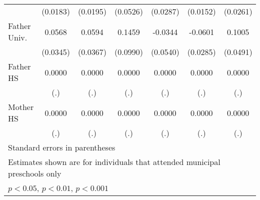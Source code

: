 \begin{table}[htbp]
\begin{tabular}{l*{6}{c}}
            &    (0.0183)         &    (0.0195)         &    (0.0526)         &    (0.0287)         &    (0.0152)         &    (0.0261)         \\
\addlinespace
Father Univ.&      0.0568         &      0.0594         &      0.1459         &     -0.0344         &     -0.0601\sym{*}  &      0.1005\sym{*}  \\
            &    (0.0345)         &    (0.0367)         &    (0.0990)         &    (0.0540)         &    (0.0285)         &    (0.0491)         \\
\addlinespace
Father HS   &      0.0000         &      0.0000         &      0.0000         &      0.0000         &      0.0000         &      0.0000         \\
            &         (.)         &         (.)         &         (.)         &         (.)         &         (.)         &         (.)         \\
\addlinespace
Mother HS   &      0.0000         &      0.0000         &      0.0000         &      0.0000         &      0.0000         &      0.0000         \\
            &         (.)         &         (.)         &         (.)         &         (.)         &         (.)         &         (.)         \\
\bottomrule
\multicolumn{7}{l}{\footnotesize Standard errors in parentheses}\\
\multicolumn{7}{l}{\footnotesize Estimates shown are for individuals that attended municipal preschools only}\\
\multicolumn{7}{l}{\footnotesize \sym{*} \(p<0.05\), \sym{**} \(p<0.01\), \sym{***} \(p<0.001\)}\\
\end{tabular}
\end{table}

